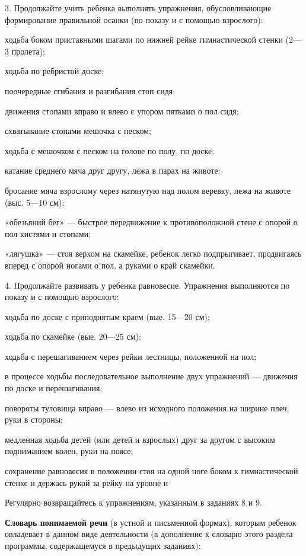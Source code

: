 \documentclass[a5paper]{book}
\begin{document}
3. Продолжайте учить ребенка выполнять упражнения, обусловливающие
формирование правильной осанки (по показу и с помощью взрослого):

ходьба боком приставными шагами по нижней рейке гимнастической стенки
(2---3 пролета);

ходьба по ребристой доске;

поочередные сгибания и разгибания стоп сидя;

движения стопами вправо и влево с упором пятками о пол сидя;

схватывание стопами мешочка с песком;

ходьба с мешочком с песком на голове по полу, по доске;

катание среднего мяча друг другу, лежа в парах на животе;

бросание мяча взрослому через натянутую над полом веревку, лежа на
животе (выс. 5---10 см);

«обезьяний бег» --- быстрое передвижение к противоположной стене с
опорой о пол кистями и стопами;

«лягушка» --- стоя верхом на скамейке, ребенок легко подпрыгивает,
продвигаясь вперед с опорой ногами о пол, а руками о край скамейки.

4. Продолжайте развивать у ребенка равновесие. Упражнения выполняются по
показу и с помощью взрослого:

ходьба по доске с приподнятым краем (вые. 15---20 см);

ходьба по скамейке (вые. 20---25 см);

ходьба с перешагиванием через рейки лестницы, положенной на пол;

в процессе ходьбы последовательное выполнение двух упражнений ---
движения по доске и перешагивания;

повороты туловища вправо --- влево из исходного положения на ширине
плеч, руки в стороны;

медленная ходьба детей (или детей и взрослых) друг за другом с высоким
подниманием колен, руки на поясе;

сохранение равновесия в положении стоя на одной ноге боком к
гимнастической стенке и держась рукой за рейку на уровне и

Регулярно возвращайтесь к упражнениям, указанным в заданиях 8 и 9.

\textbf{Словарь понимаемой речи} (в устной и письменной формах), которым
ребенок овладевает в данном виде деятельности (в дополнение к словарю
этого раздела программы, содержащемуся в предыдущих заданиях):
\end{document}
